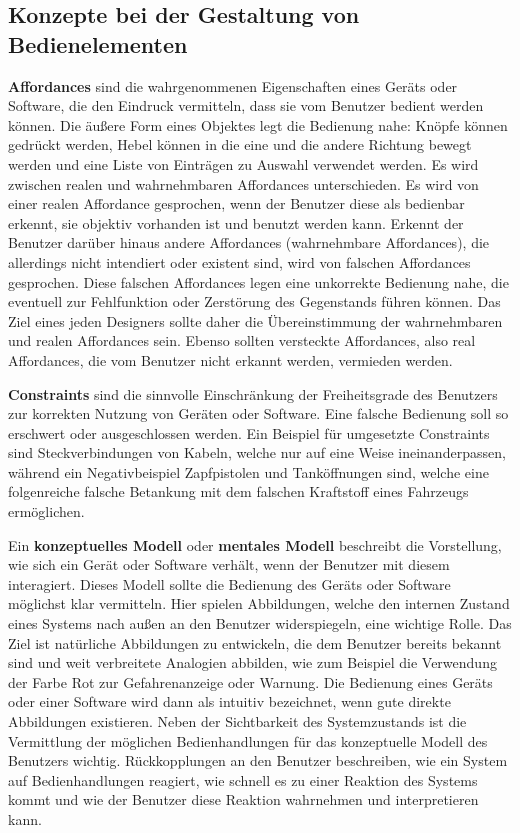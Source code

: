 \subsection{Konzepte bei der Gestaltung von Bedienelementen}
\textbf{Affordances} sind die wahrgenommenen Eigenschaften eines Geräts oder Software, die den Eindruck vermitteln, dass sie vom Benutzer bedient werden können. Die äußere Form eines Objektes legt die Bedienung nahe: Knöpfe können gedrückt werden, Hebel können in die eine und die andere Richtung bewegt werden und eine Liste von Einträgen zu Auswahl verwendet werden. Es wird zwischen realen und wahrnehmbaren Affordances unterschieden. Es wird von einer realen Affordance gesprochen, wenn der Benutzer diese als bedienbar erkennt, sie objektiv vorhanden ist und benutzt werden kann. Erkennt der Benutzer darüber hinaus andere Affordances (wahrnehmbare Affordances), die allerdings nicht intendiert oder existent sind, wird von falschen Affordances gesprochen. Diese falschen Affordances legen eine unkorrekte Bedienung nahe, die eventuell zur Fehlfunktion oder Zerstörung des Gegenstands führen können. Das Ziel eines jeden Designers sollte daher die Übereinstimmung der wahrnehmbaren und realen Affordances sein. Ebenso sollten versteckte Affordances, also real Affordances, die vom Benutzer nicht erkannt werden, vermieden werden. \cite[S. 136 ff.]{2010.Preim}

\textbf{Constraints} sind die sinnvolle Einschränkung der Freiheitsgrade des Benutzers zur korrekten Nutzung von Geräten oder Software. Eine falsche Bedienung soll so erschwert oder ausgeschlossen werden. Ein Beispiel für umgesetzte Constraints sind Steckverbindungen von Kabeln, welche nur auf eine Weise ineinanderpassen, während ein Negativbeispiel Zapfpistolen und Tanköffnungen sind, welche eine folgenreiche falsche Betankung mit dem falschen Kraftstoff eines Fahrzeugs ermöglichen. \cite[S. 136 ff.]{2010.Preim}

Ein \textbf{konzeptuelles Modell} oder \textbf{mentales Modell} beschreibt die Vorstellung, wie sich ein Gerät oder Software verhält, wenn der Benutzer mit diesem interagiert. Dieses Modell sollte die Bedienung des Geräts oder Software möglichst klar vermitteln. Hier spielen Abbildungen, welche den internen Zustand eines Systems nach außen an den Benutzer widerspiegeln, eine wichtige Rolle. Das Ziel ist natürliche Abbildungen zu entwickeln, die dem Benutzer bereits bekannt sind und weit verbreitete Analogien abbilden, wie zum Beispiel die Verwendung der Farbe Rot zur Gefahrenanzeige oder Warnung. Die Bedienung eines Geräts oder einer Software wird dann als intuitiv bezeichnet, wenn gute direkte Abbildungen existieren. Neben der Sichtbarkeit des Systemzustands ist die Vermittlung der möglichen Bedienhandlungen für das konzeptuelle Modell des Benutzers wichtig. Rückkopplungen an den Benutzer beschreiben, wie ein System auf Bedienhandlungen reagiert, wie schnell es zu einer Reaktion des Systems kommt und wie der Benutzer diese Reaktion wahrnehmen und interpretieren kann. \cite[S. 136 ff.]{2010.Preim}

